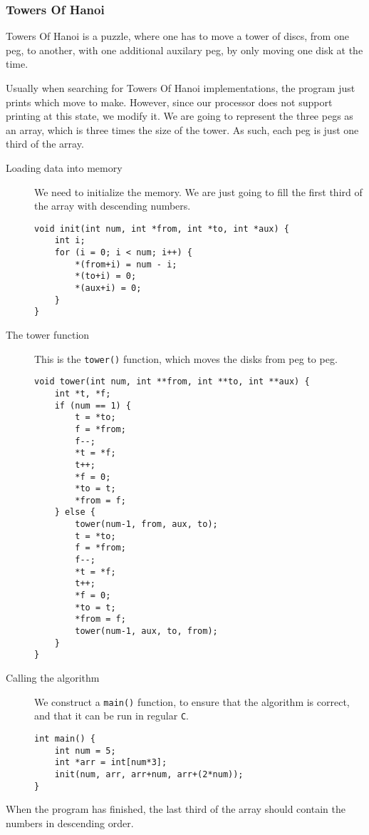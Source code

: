 \subsubsection*{Towers Of Hanoi}
Towers Of Hanoi is a puzzle, where one has to move a tower of discs, from one
peg, to another, with one additional auxilary peg, by only moving one disk at
the time.

Usually when searching for Towers Of Hanoi implementations, the program just
prints which move to make. However, since our processor does not support
printing at this state, we modify it. We are going to represent the three pegs
as an array, which is three times the size of the tower. As such, each peg is
just one third of the array.

\begin{description}
    \item[Loading data into memory] We need to initialize the memory. We are
        just going to fill the first third of the array with descending
        numbers.
\begin{lstlisting}
void init(int num, int *from, int *to, int *aux) {
    int i;
    for (i = 0; i < num; i++) {
        *(from+i) = num - i;
        *(to+i) = 0;
        *(aux+i) = 0;
    }
}
\end{lstlisting}

    \item[The tower function] This is the \texttt{tower()} function, which
        moves the disks from peg to peg.
\begin{lstlisting}
void tower(int num, int **from, int **to, int **aux) {
    int *t, *f;
    if (num == 1) {
        t = *to;
        f = *from;
        f--;
        *t = *f;
        t++;
        *f = 0;
        *to = t;
        *from = f;
    } else {
        tower(num-1, from, aux, to);
        t = *to;
        f = *from;
        f--;
        *t = *f;
        t++;
        *f = 0;
        *to = t;
        *from = f;
        tower(num-1, aux, to, from);
    }
}
\end{lstlisting}

    \item[Calling the algorithm] We construct a \texttt{main()} function, to
        ensure that the algorithm is correct, and that it can be run in regular
        \texttt{C}.
\begin{lstlisting}
int main() {
    int num = 5;
    int *arr = int[num*3];
    init(num, arr, arr+num, arr+(2*num));
}
\end{lstlisting}
\end{description}
When the program has finished, the last third of the array should contain the
numbers in descending order.
